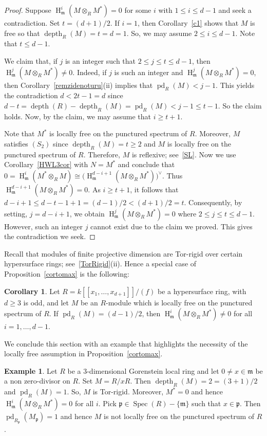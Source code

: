 \documentclass[11pt]{amsart}
\theoremstyle{definition}
\newtheorem{cor}[thm]{Corollary}
\theoremstyle{definition}
\newtheorem{eg}[thm]{Example}
\numberwithin{equation}{section}
\newcommand{\fm}{\mathfrak{m}}
\newcommand{\fp}{\mathfrak{p}}
\DeclareMathOperator{\depth}{depth}
\DeclareMathOperator{\hh}{H}
\DeclareMathOperator{\pd}{pd}
\DeclareMathOperator{\Spec}{Spec}
\begin{document}
\begin{proof} Suppose $\hh^i_{\fm}(M\otimes_RM^*)=0$ for some $i$ with $1\leq i \leq d-1$ and seek a contradiction. Set $t=(d+1)/2$. If $i=1$, then Corollary~\ref{c1} shows that $M$ is free so that $\depth_R(M)=t=d=1$. So, we may assume $2\leq i \leq d-1$. Note that $t\leq d-1$. 

We claim that, if $j$ is an integer such that $2\leq j\leq t  \leq d-1$, then $\hh^j_{\fm}(M\otimes_RM^*)\neq 0$. Indeed, if $j$ is such an integer and $\hh^j_{\fm}(M\otimes_RM^*)=0$, then 
Corollary~\ref{remzidenoturu}(ii) implies that $\pd_R(M)<j-1$. This yields the contradiction $d<2t-1=d$ since $d-t=\depth(R)-\depth_R(M)=\pd_R(M)<j-1\leq t-1$. So the claim holds. Now, by the claim, we may assume that $i\geq t+1$. 

Note that $M^{\ast}$ is locally free on the punctured spectrum of $R$. Moreover, $M$ satisfies $(S_2)$ since $\depth_R(M)=t\geq 2$ and $M$ is locally free on the punctured spectrum of $R$. Therefore, $M$ is reflexive; see~\ref{SL}. Now we use Corollary~\ref{HWL3cor} with $N=M^{\ast}$ and conclude that $0=\hh_{\fm}^i(M^\ast\otimes_RM)\cong \big(\hh_{\fm}^{d-i+1}(M \otimes_RM^{\ast})\big)^{\vee}$. Thus $\hh_{\fm}^{d-i+1}(M \otimes_RM^{\ast})=0$. As $i\geq t+1$, it follows that $d-i+1\leq d-t-1+1=(d-1)/2<(d+1)/2=t$. Consequently, by setting, $j=d-i+1$, we obtain $\hh_{\fm}^{j}(M \otimes_RM^{\ast})=0$ where $2\leq j\leq t  \leq d-1$. However, such an integer $j$ cannot exist due to the claim we proved. This gives the contradiction we seek.
\end{proof}

Recall that modules of finite projective dimension are Tor-rigid over certain hypersurface rings; see~\ref{TorRigid}(ii). Hence a special case of Proposition~\ref{cortomax} is the following:

\begin{cor} Let $R=k[\![x_1, \ldots, x_{d+1}]\!]/(f)$ be a hypersurface ring, with $d\geq 3$ is odd, and let $M$ be an $R$-module which is locally free on the punctured spectrum of $R$. If $\pd_R(M)=(d-1)/2$, then $\hh^i_{\fm}(M\otimes_RM^*)\neq 0$ for all $i=1, \ldots, d-1$.  
\end{cor}

We conclude this section with an example that highlights the necessity of the locally free assumption in Proposition~\ref{cortomax}.

\begin{eg}\label{notvb2} Let $R$ be a $3$-dimensional Gorenstein local ring and let $0\neq x\in \fm$ be a non zero-divisor on $R$. Set $M= R/xR$. Then $\depth_R(M)=2=(3+1)/2$ and $\pd_R(M)=1$. So, $M$ is Tor-rigid. Moreover, $M^{\ast}=0$ and hence $\hh^i_{\fm}(M\otimes_RM^*)=0$ for all $i$. Pick $\fp \in \Spec(R)-\{\fm\}$ such that $x \in \fp$. Then $\pd_{R_{\fp}}(M_{\fp})=1$ and hence $M$ is not locally free on the punctured spectrum of $R$.
\end{eg}
\end{document}
